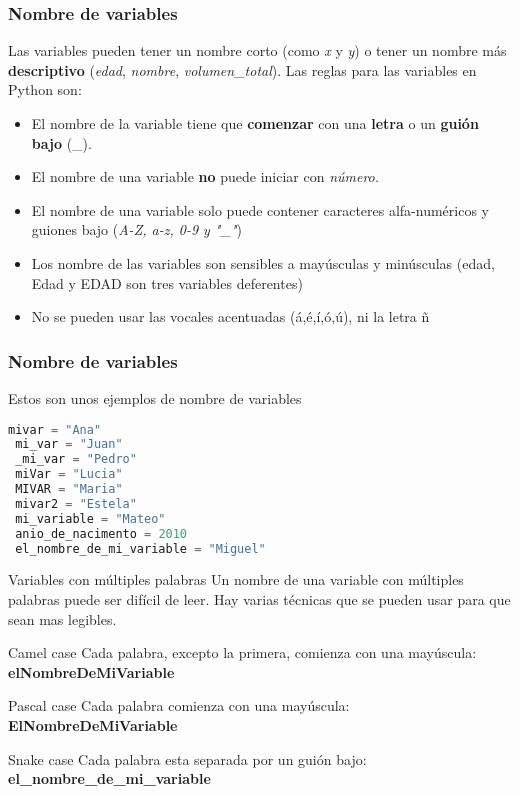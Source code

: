 \begin{frame}[fragile]
  \frametitle{Nombre de variables}

  \vspace{\baselineskip}
  Las variables pueden tener un nombre corto (como \textit{x} y \textit{y})
  o tener un nombre más \textbf{descriptivo} (\textit{edad}, \textit{nombre},
  \textit{volumen\_total}). Las reglas para las variables en Python son:
  \pausa

  \vspace{\baselineskip}
  \begin{itemize}
    \item El nombre de la variable tiene que \textbf{comenzar} con una
      \textbf{letra} o un \textbf{guión bajo} (\_).
    \pausa
    \item El nombre de una variable \textbf{no} puede iniciar con
      \textit{número.}
    \pausa
    \item El nombre de una variable solo puede contener caracteres
      alfa-numéricos y guiones bajo (\textit{A-Z, a-z, 0-9 y "\_"})
    \pausa
    \item Los nombre de las variables son sensibles a mayúsculas y minúsculas
      (edad, Edad y EDAD son tres variables deferentes)
    \pausa
  \item No se pueden usar las vocales acentuadas (á,é,í,ó,ú), ni la letra ñ
  \end{itemize}
\end{frame}

\begin{frame}[fragile]
  \frametitle{Nombre de variables}

  Estos son unos ejemplos de nombre de variables

  \vspace{\baselineskip}
  \begin{lstlisting}[language=Python]
 mivar = "Ana"
 mi_var = "Juan"
 _mi_var = "Pedro"
 miVar = "Lucia"
 MIVAR = "Maria"
 mivar2 = "Estela"
 mi_variable = "Mateo"
 anio_de_nacimento = 2010
 el_nombre_de_mi_variable = "Miguel"
  \end{lstlisting}
\end{frame}

\begin{frame}[c]{Variables con múltiples palabras}
  Un nombre de una variable con múltiples palabras puede ser difícil de leer.
  Hay varias técnicas que se pueden usar para que sean mas legibles.
  \pausa
  \begin{block}{Camel case}
    Cada palabra, excepto la primera, comienza con una mayúscula:
    \textbf{elNombreDeMiVariable}
  \end{block}
  \pausa
  \begin{block}{Pascal case}
    Cada palabra comienza con una mayúscula:
    \textbf{ElNombreDeMiVariable}
  \end{block}
  \pausa
  \begin{exampleblock}{Snake case}
    Cada palabra esta separada por un guión bajo:
    \textbf{el\_nombre\_de\_mi\_variable}
  \end{exampleblock}
\end{frame}


